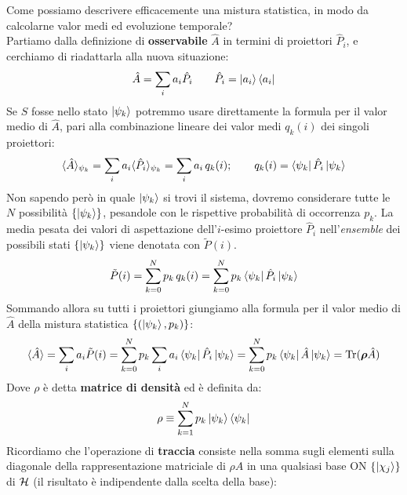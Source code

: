 \documentclass[../../InformazioneQuantistica.tex]{subfiles}
\begin{document}
Come possiamo descrivere efficacemente una mistura statistica, in modo da calcolarne valor medi ed evoluzione temporale?\\
Partiamo dalla definizione di \textbf{osservabile} $\hat{A}$ in termini di proiettori $\hat{P}_i$, e cerchiamo di riadattarla alla nuova situazione:
\begin{align}
\hat{A} = \sum_i a_i \hat{P}_i \qquad \hat{P}_i = \Ket{a_i}\Bra{a_i}
\label{eqn:osservabile-def}
\end{align}
Se $S$ fosse nello stato $\Ket{\psi_k}$ potremmo usare direttamente la formula per il valor medio di $\hat{A}$, pari alla combinazione lineare dei valor medi $q_k(i)$ dei singoli proiettori:
\begin{align}
\langle \hat{A} \rangle_{\psi_k} = \sum_i a_i \langle \hat{P}_i \rangle_{\psi_k} = \sum_i a_i\, q_k(i); \qquad q_k(i) = \Bra{\psi_k}\hat{P}_i\Ket{\psi_k}
\label{eqn:val-medio-psik}
\end{align}
Non sapendo però in quale $\Ket{\psi_k}$ si trovi il sistema, dovremo considerare tutte le $N$ possibilità $\{\Ket{\psi_k}\}$, pesandole con le rispettive probabilità di occorrenza $p_k$. La media pesata dei valori di aspettazione dell'$i$-esimo proiettore $\hat{P}_i$ nell'\textit{ensemble} dei possibili stati $\{\Ket{\psi_k}\}$ viene denotata con $\tilde{P}(i)$. 
\begin{align*}
\tilde{P}(i) = \sum_{k=0}^N p_k \,q_k(i) = \sum_{k=0}^N p_k \Bra{\psi_k}\hat{P}_i \Ket{\psi_k}
\end{align*}
Sommando allora su tutti i proiettori giungiamo alla formula per il valor medio di $\hat{A}$ della mistura statistica $\{(\Ket{\psi_k},p_k)\}$:
\begin{align}
\langle \hat{A} \rangle = \sum_i a_i \tilde{P}(i) = \sum_{k=0}^N p_k \sum_i a_i \Bra{\psi_k}\hat{P}_i\Ket{\psi_k} = \sum_{k=0}^N p_k \Bra{\psi_k}\hat{A}\Ket{\psi_k} = \operatorname{Tr}(\bm{\rho} \hat{A})
\label{eqn:traccia-valor-medio}
\end{align}
Dove $\rho$ è detta \textbf{matrice di densità} ed è definita da:
\begin{align}
\rho \equiv \sum_{k=1}^N p_k \Ket{\psi_k}\Bra{\psi_k}
\label{eqn:matrice-density}
\end{align}
Ricordiamo che l'operazione di \textbf{traccia} consiste nella somma sugli elementi sulla diagonale della rappresentazione matriciale di $\rho A$ in una qualsiasi base ON $\{\Ket{\chi_j}\}$ di $\mathcal{H}$ (il risultato è indipendente dalla scelta della base):
\end{document}
